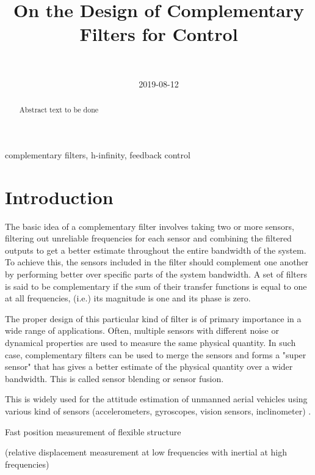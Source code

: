 \documentclass[9pt, technote, a4paper]{ieeeconf}
\author{\IEEEauthorblockN{Dehaeze Thomas\IEEEauthorrefmark{*} and Collette Christophe} \\ \IEEEauthorblockA{Precision Mechatronics Laboratory, ULB\\ Brussels, Belgium\\ Email: \IEEEauthorrefmark{*}dehaeze.thomas@gmail.com}}
\date{2019-08-12}
\title{On the Design of Complementary Filters for Control}
\begin{document}
\maketitle


\begin{abstract}
Abstract text to be done
\end{abstract}

\begin{IEEEkeywords}
complementary filters, h-infinity, feedback control
\end{IEEEkeywords}

\section{Introduction}
\label{sec:orgb15ebed}
  \label{sec:introduction}
The basic idea of a complementary filter involves taking two or more sensors, filtering out unreliable frequencies for each sensor and combining the filtered outputs to get a better estimate throughout the entire bandwidth of the system.
To achieve this, the sensors included in the filter should complement one another by performing better over specific parts of the system bandwidth.
A set of filters is said to be complementary if the sum of their transfer functions is equal to one at all frequencies, (i.e.) its magnitude is one and its phase is zero.

The proper design of this particular kind of filter is of primary importance in a wide range of applications.
Often, multiple sensors with different noise or dynamical properties are used to measure the same physical quantity.
In such case, complementary filters can be used to merge the sensors and forms a "super sensor" that has gives a better estimate of the physical quantity over a wider bandwidth.
This is called sensor blending or sensor fusion.

This is widely used for the attitude estimation of unmanned aerial vehicles using various kind of sensors (accelerometers, gyroscopes, vision sensors, inclinometer) \cite{zimmermann92_high_bandw_orien_measur_contr,corke04_inert_visual_sensin_system_small_auton_helic,min15_compl_filter_desig_angle_estim}.

\cite{shaw90_bandw_enhan_posit_measur_using_measur_accel} Fast position measurement of flexible structure

\cite{matichard15_seism_isolat_advan_ligo} (relative displacement measurement at low frequencies with inertial at high frequencies)
\end{document}
